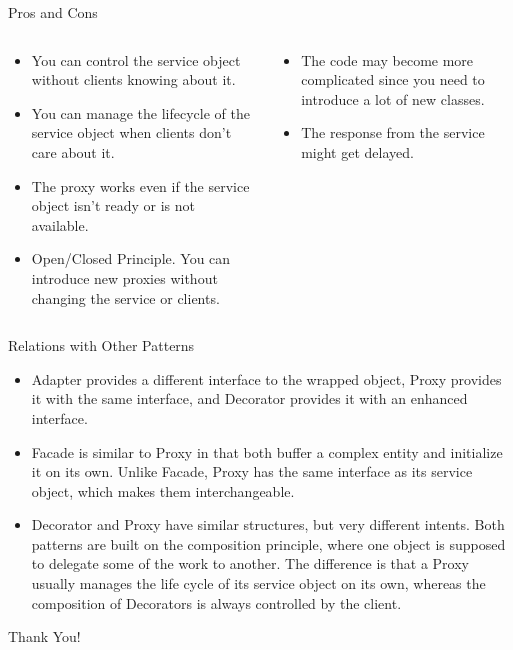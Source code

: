 \documentclass[13pt]{beamer}
\begin{document}
\begin{frame}{Pros and Cons}
	\begin{columns}[T]
		\begin{column}{.5\textwidth}
			\begin{itemize}
				\item You can control the service object without clients knowing about it.
				\item You can manage the lifecycle of the service object when clients don’t care about it.
				\item The proxy works even if the service object isn’t ready or is not available.
				\item Open/Closed Principle. You can introduce new proxies without changing the service or clients.
			\end{itemize}
		\end{column}
	
		\begin{column}{.5\textwidth}
			\begin{itemize}
				\item The code may become more complicated since you need to introduce a lot of new classes.
				\item The response from the service might get delayed.
			\end{itemize}
		\end{column}
	\end{columns}
\end{frame}

\begin{frame}{Relations with Other Patterns}
	\begin{itemize}
		\setlength\itemsep{1em}
		\item Adapter provides a different interface to the wrapped object, Proxy provides it with the same interface, and Decorator provides it with an enhanced interface.
		\item Facade is similar to Proxy in that both buffer a complex entity and initialize it on its own. Unlike Facade, Proxy has the same interface as its service object, which makes them interchangeable.
		\item Decorator and Proxy have similar structures, but very different intents. Both patterns are built on the composition principle, where one object is supposed to delegate some of the work to another. The difference is that a Proxy usually manages the life cycle of its service object on its own, whereas the composition of Decorators is always controlled by the client.
	\end{itemize}
\end{frame}

\begin{frame}
\begin{center}
{\fontsize{40}{50}\selectfont Thank You!}
\end{center}
\end{frame}
\end{document}
